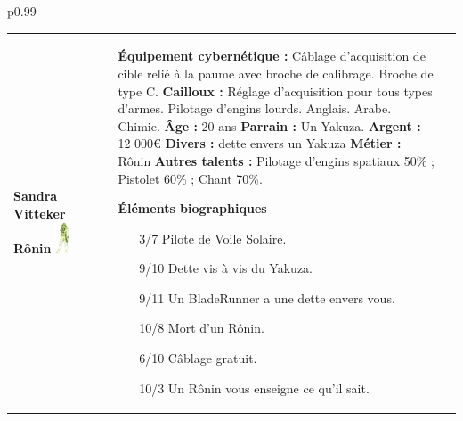 \documentclass[11pt,twoside,a4paper]{article}
\begin{document}
\begin{longtable}[ht]{ p{} }
		\hline
	\begin{tabular}[h]{ p{} p{} p{} }
		\textbf{Sandra Vitteker}										\newline
		\textbf{\small R{\^o}nin}										\newline
			\newline
		\includegraphics[width=0.15\textwidth]{img/personnageSandraVitteker.jpg}		
			\newline
			
		& %
			
		\textbf{{\'E}quipement cybern{\'e}tique : }C{\^a}blage d'acquisition de cible reli{\'e} {\`a} la paume avec broche de calibrage. Broche de type C. \newline
		\textbf{Cailloux : }R{\'e}glage d'acquisition pour tous types d'armes. Pilotage d'engins lourds. Anglais. Arabe. Chimie. \newline
		\textbf{{\^A}ge : } 20 ans 											\newline
		\textbf{Parrain : } Un Yakuza. 										\newline
		\textbf{Argent : } 12 000\euro 										\newline
		\textbf{Divers : } dette envers un Yakuza							\newline
		\textbf{M{\'e}tier : } R{\^o}nin  									\newline
		\textbf{Autres talents : } Pilotage d'engins spatiaux 50\% ; Pistolet 60\% ; Chant 70\%. \newline
		
		\textbf{{\'E}l{\'e}ments biographiques}
		\begin{itemize}
			\item[3/7] Pilote de Voile Solaire. 
			\item[9/10] Dette vis {\`a} vis du Yakuza. 
			\item[9/11] Un BladeRunner a une dette envers vous. 
			\item[10/8] Mort d'un R{\^o}nin. 
			\item[6/10] C{\^a}blage gratuit. 
			\item[10/3] Un R{\^o}nin vous enseigne ce qu'il sait. 
		\end{itemize}
		

\end{tabular}
\end{longtable}
\end{document}
